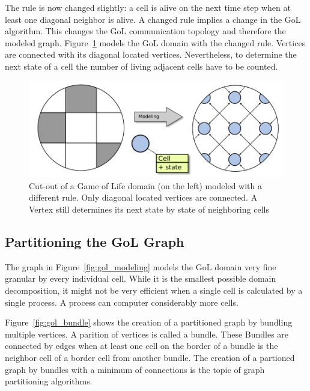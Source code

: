 \noindent The rule is now changed slightly: a cell is alive on the next time
step when at least one diagonal neighbor is alive.  A changed rule
 implies a change in the GoL algorithm.  This changes the GoL
communication topology and therefore the modeled
graph. Figure~\ref{fig:gol_modeling_changed} models the GoL domain
with the changed rule. Vertices are connected with its diagonal
located vertices. Nevertheless, to determine the next state of a cell
the number of living adjacent cells have to be counted.

\begin{figure}[H]
  \centering \includegraphics[width=\textwidth]{graphics/30_gol_modeling_changed}
  \caption{Cut-out of a Game of Life domain (on the left) modeled
    with a different rule. Only diagonal located vertices are connected.
  A Vertex still determines its next state by state of neighboring cells}
  \label{fig:gol_modeling_changed}
\end{figure}


\subsection{Partitioning the GoL Graph}
The graph in Figure~\ref{fig:gol_modeling} models the GoL domain very fine
granular by every individual cell. While it is the smallest possible
domain decomposition, it might not be very efficient when a single cell
is calculated by a single process. A process can computer
considerably more cells.

Figure~\ref{fig:gol_bundle} shows the creation of a partitioned graph
by bundling multiple vertices. A parition of vertices is called a
bundle. These Bundles are connected by edges when at least one cell on
the border of a bundle is the neighbor cell of a border cell from
another bundle.  The creation of a partioned graph by bundles with a
minimum of connections is the topic of graph partitioning algorithms.

